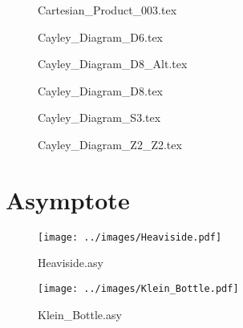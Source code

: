 \documentclass{article}
\begin{document}
        \begin{figure}[H]
            \centering
            
            \caption{Cartesian\_Product\_003.tex}
        \end{figure}
        \begin{figure}[H]
            \centering
            
            \caption{Cayley\_Diagram\_D6.tex}
        \end{figure}
        \begin{figure}[H]
            \centering
            
            \caption{Cayley\_Diagram\_D8\_Alt.tex}
        \end{figure}
        \begin{figure}[H]
            \centering
            
            \caption{Cayley\_Diagram\_D8.tex}
        \end{figure}
        \begin{figure}[H]
            \centering
            
            \caption{Cayley\_Diagram\_S3.tex}
        \end{figure}
        \begin{figure}[H]
            \centering
            
            \caption{Cayley\_Diagram\_Z2\_Z2.tex}
        \end{figure}
    \section{Asymptote}
        \begin{figure}[H]
            \centering
            \texttt{[image: ../images/Heaviside.pdf]}
            \caption{Heaviside.asy}
        \end{figure}
        \begin{figure}[H]
            \centering
            \texttt{[image: ../images/Klein\_Bottle.pdf]}
            \caption{Klein\_Bottle.asy}
        \end{figure}
\end{document}
